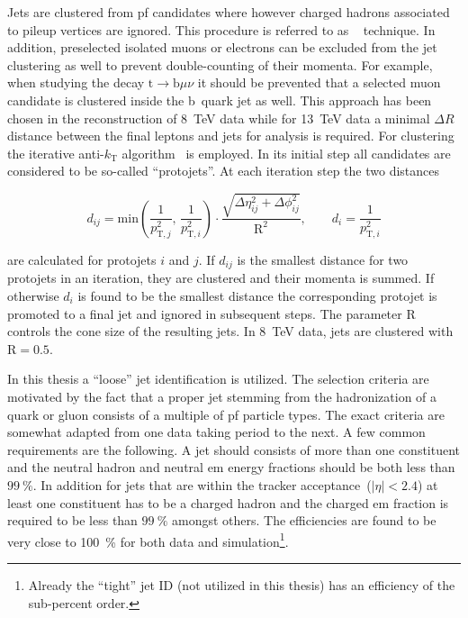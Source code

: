 Jets are clustered from \gls{pf} candidates where however charged hadrons associated to pileup vertices are ignored. This procedure is referred to as ~\cite{CMS-PAS-JME-14-001} technique. In addition, preselected isolated muons or electrons can be excluded from the jet clustering as well to prevent double-counting of their momenta. For example, when studying the decay $\mathrm{t}\to \mathrm{b}\mu\nu$ it should be prevented that a selected muon candidate is clustered inside the b~quark jet as well. This approach has been chosen in the reconstruction of 8~TeV data while for 13~TeV data a minimal $\Delta R$ distance between the final leptons and jets for analysis is required. For clustering the iterative anti-$k_\mathrm{T}$ algorithm~\cite{Cacciari:2008gp} is employed. In its initial step all candidates are considered to be so-called ``protojets''. At each iteration step the two distances

\begin{equation}
d_{ij}=\mathrm{min}\left(\frac{1}{p_{\mathrm{T},j}^{2}},\,\frac{1}{p_{\mathrm{T},i}^{2}}\right)\cdot\frac{\sqrt{\Delta\eta_{ij}^{2}+\Delta\phi_{ij}^{2}}}{\mathrm{R}^2},\qquad d_{i}=\frac{1}{p_{\mathrm{T},i}^{2}}
\end{equation}

are calculated for protojets $i$ and $j$.  If $d_{ij}$ is the smallest distance for two protojets in an iteration, they are clustered and their momenta is summed. If otherwise $d_{i}$ is found to be the smallest distance the corresponding protojet is promoted to a final jet and ignored in subsequent steps. The parameter $\mathrm{R}$ controls the cone size of the resulting jets. In 8~TeV data, jets are clustered with $\mathrm{R}=0.5$. 

In this thesis a ``loose'' jet identification is utilized. The selection criteria are motivated by the fact that a proper jet stemming from the hadronization of a quark or gluon consists of a multiple of \gls{pf} particle types. The exact criteria are somewhat adapted from one data taking period to the next. A few common requirements are the following. A jet should consists of more than one constituent and the neutral hadron and neutral \gls{em} energy fractions should be both less than $99~\%$. In addition for jets that are within the tracker acceptance~($|\eta|<2.4$) at least one constituent has to be a charged hadron and the charged \gls{em} fraction is required to be less than $99~\%$ amongst others. The efficiencies are found to be very close to 100~\% for both data and simulation\footnote{Already the ``tight'' jet ID (not utilized in this thesis) has an efficiency of the sub-percent order.}.

